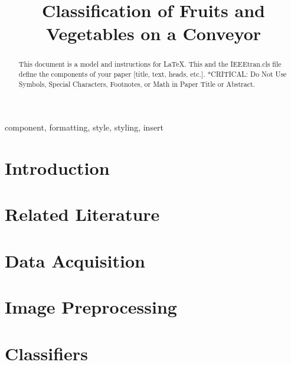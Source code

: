 \documentclass[conference]{IEEEtran}
\begin{document}
	
	\title{Classification of Fruits and Vegetables on a Conveyor}
		\author{
		\and
		\and
	}
	
	\maketitle
	
	\begin{abstract}
		This document is a model and instructions for \LaTeX.
		This and the IEEEtran.cls file define the components of your paper [title, text, heads, etc.]. *CRITICAL: Do Not Use Symbols, Special Characters, Footnotes, 
		or Math in Paper Title or Abstract.
	\end{abstract}
	
	\begin{IEEEkeywords}
		component, formatting, style, styling, insert
	\end{IEEEkeywords}
	
	\section{Introduction}
	
	
	\section{Related Literature}
	
	
	\section{Data Acquisition}
	
	
	\section{Image Preprocessing}
	
	
	\section{Classifiers} \label{classifiers}
	
\end{document}
